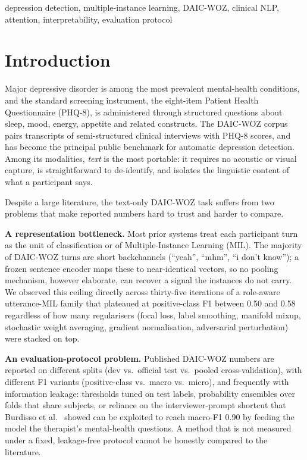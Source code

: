 \documentclass[conference]{IEEEtran}
\begin{document}
\begin{IEEEkeywords}
depression detection, multiple-instance learning, DAIC-WOZ, clinical NLP,
attention, interpretability, evaluation protocol
\end{IEEEkeywords}

\section{Introduction}

Major depressive disorder is among the most prevalent mental-health
conditions, and the standard screening instrument, the eight-item Patient
Health Questionnaire (PHQ-8), is administered through structured questions
about sleep, mood, energy, appetite and related constructs. The DAIC-WOZ
corpus \cite{gratch2014,devault2014} pairs transcripts of semi-structured
clinical interviews with PHQ-8 scores, and has become the principal public
benchmark for automatic depression detection. Among its modalities, \emph{text} is the most portable: it requires
no acoustic or visual capture, is straightforward to de-identify, and isolates
the linguistic content of what a participant says.

Despite a large literature, the text-only DAIC-WOZ task suffers from two
problems that make reported numbers hard to trust and harder to compare.

\textbf{A representation bottleneck.} Most prior systems treat each
participant turn as the unit of classification or of Multiple-Instance
Learning (MIL). The majority of DAIC-WOZ turns are short backchannels
(``yeah'', ``mhm'', ``i don't know''); a frozen sentence encoder maps these to
near-identical vectors, so no pooling mechanism, however elaborate, can recover
a signal the instances do not carry. We observed this ceiling directly across
thirty-five iterations of a role-aware utterance-MIL family that plateaued at
positive-class F1 between 0.50 and 0.58 regardless of how many regularisers
(focal loss, label smoothing, manifold mixup, stochastic weight averaging,
gradient normalisation, adversarial perturbation) were stacked on top.

\textbf{An evaluation-protocol problem.} Published DAIC-WOZ numbers are
reported on different splits (dev vs.\ official test vs.\ pooled
cross-validation), with different F1 variants (positive-class vs.\ macro
vs.\ micro), and frequently with information leakage: thresholds tuned on test
labels, probability ensembles over folds that share subjects, or reliance on
the interviewer-prompt shortcut that Burdisso et al.\ \cite{burdisso2024}
showed can be exploited to reach macro-F1 0.90 by feeding the model the
therapist's mental-health questions. A method that is not measured under a
fixed, leakage-free protocol cannot be honestly compared to the literature.
\end{document}
